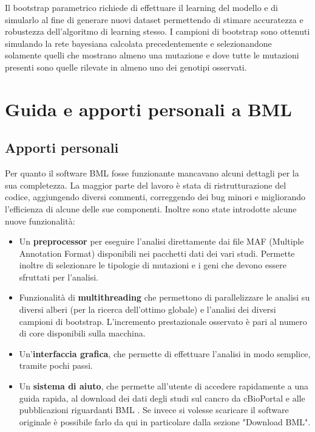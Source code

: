 \documentclass[a4paper]{article}
\begin{document}
	Il bootstrap parametrico richiede di effettuare il learning del modello e di simularlo al fine di generare nuovi dataset permettendo 
	di stimare accuratezza e robustezza dell'algoritmo di learning stesso. I campioni di bootstrap sono ottenuti simulando la rete bayesiana calcolata precedentemente 
	e selezionandone solamente quelli che mostrano almeno una mutazione e dove tutte le mutazioni presenti sono quelle rilevate in almeno uno dei genotipi osservati.


	\section{\LARGE Guida e apporti personali a BML}

	\subsection{\large Apporti personali}

	Per quanto il software BML fosse funzionante mancavano alcuni dettagli per la sua completezza. La maggior parte del lavoro è stata di ristrutturazione
	del codice, aggiungendo diversi commenti, correggendo dei bug minori e migliorando l'efficienza di alcune delle sue componenti. Inoltre sono state introdotte
	alcune nuove funzionalità:

	\begin{itemize}
 	\item Un \textbf{preprocessor} per eseguire l'analisi direttamente dai file MAF (Multiple Annotation Format) \cite{MAF} disponibili nei pacchetti dati 
	dei vari studi. Permette inoltre di selezionare le tipologie di mutazioni e i geni che devono essere sfruttati per l'analisi.
	\item Funzionalità di \textbf{multithreading} che permettono di parallelizzare le analisi su diversi alberi (per la ricerca dell'ottimo globale) 
	      e l'analisi dei diversi campioni di bootstrap. L'incremento prestazionale osservato è pari al numero di core disponibili sulla macchina.
	\item Un'\textbf{interfaccia grafica}, che permette di effettuare l'analisi in modo semplice, tramite pochi passi.   	
	\item Un \textbf{sistema di aiuto}, che permette all'utente di accedere rapidamente a una guida rapida, al download dei dati degli studi sul cancro da cBioPortal e 
	alle pubblicazioni riguardanti BML \cite{BMLPub, cBio, BMLSite}. Se invece si volesse 
	scaricare il software originale è possibile farlo da qui \cite{BMLSite} in particolare dalla sezione "Download BML".	

	\end{itemize}
		
\end{document}
